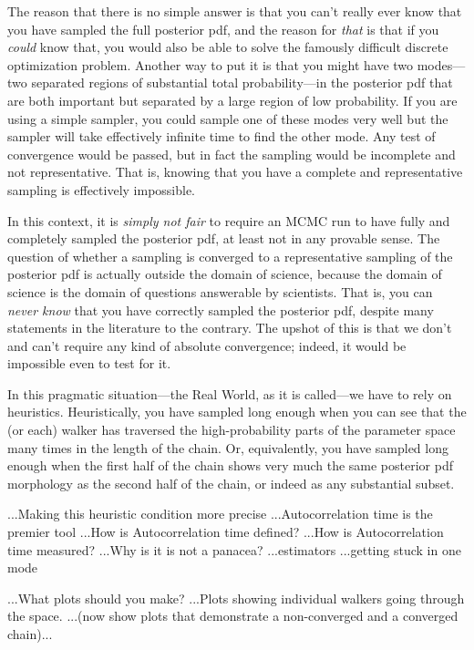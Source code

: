 \documentclass[12pt,twoside,pdftex]{article}
\begin{document}
The reason that there is no simple answer is that you can't really
ever know that you have sampled the full posterior pdf, and the reason
for \emph{that} is that if you \emph{could} know that, you would also
be able to solve the famously difficult discrete optimization
problem.
Another way to put it is that you might have two modes---two separated
regions of substantial total probability---in the posterior pdf that
are both important but separated by a large region of low probability.
If you are using a simple sampler, you could sample one of these modes
very well but the sampler will take effectively infinite time to find
the other mode.
Any test of convergence would be passed, but in fact the sampling
would be incomplete and not representative.
That is, knowing that you have a complete and representative sampling
is effectively impossible.

In this context,
  it is \emph{simply not fair} to require an MCMC run to have fully and completely
  sampled the posterior pdf,
  at least not in any provable sense.
The question of whether a sampling is converged to a representative sampling
  of the posterior pdf is actually outside the domain of science,
  because the domain of science is the domain of questions answerable by scientists.
That is, you can \emph{never know} that you have correctly sampled the posterior pdf,
  despite many statements in the literature to the contrary.%
The upshot of this is that we don't and can't require any kind of absolute convergence;
  indeed, it would be impossible even to test for it.

In this pragmatic situation---the Real World, as it is called---we have to rely on heuristics.
Heuristically, you have sampled long enough when you can see
that the (or each) walker has traversed the high-probability parts of
the parameter space many times in the length of the chain.
Or, equivalently, you have sampled long enough when the first half of
the chain shows very much the same posterior pdf morphology as the
second half of the chain, or indeed as any substantial subset.

...Making this heuristic condition more precise
...Autocorrelation time is the premier tool
...How is Autocorrelation time defined?
...How is Autocorrelation time measured?
...Why is it is not a panacea? ...estimators ...getting stuck in one mode

...What plots should you make?
...Plots showing individual walkers going through the space.
...(now show plots that demonstrate a non-converged and a converged chain)...
\end{document}
